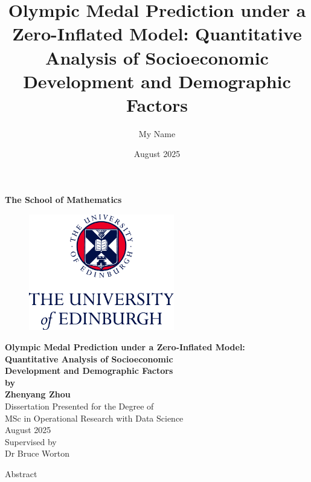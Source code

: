 \documentclass[11pt,twoside]{article}
\title{Olympic Medal Prediction under a Zero-Inflated Model: Quantitative Analysis of Socioeconomic Development and Demographic Factors}
\author{My Name}
\date{August 2025}
\numberwithin{Theorem}{section}
\numberwithin{Definition}{section}
\numberwithin{Lemma}{section}
\numberwithin{Algorithm}{section}
\numberwithin{equation}{section}
\begin{document}
\pagestyle{empty}

\begin{titlepage}
\vspace*{.5em}
\center
\textbf{\large{The School of Mathematics}} \\
\vspace*{1em}
\begin{figure}[!h]
\centering
\includegraphics[width=180pt]{CentredLogoCMYK.jpg}
\end{figure}
\vspace{2em}
\textbf{\Huge{Olympic Medal Prediction under a Zero-Inflated Model:}} \\
\textbf{\Huge{Quantitative Analysis of Socioeconomic}} \\
\textbf{\Huge{Development and Demographic Factors}} \\[2em]
\textbf{\LARGE{by}}\\
\vspace{2em}
\textbf{\LARGE{Zhenyang Zhou}}\\
\vspace{6.5em}
\Large{Dissertation Presented for the Degree of\\
MSc in Operational Research with Data Science}\\
\vspace{6.5em}
\Large{August 2025}\\ 
\vspace{3em}
\Large{Supervised by\\Dr Bruce Worton}
\vfill
\end{titlepage}

\cleardoublepage

\begin{center}
\Large{Abstract}
\end{center}
\end{document}
